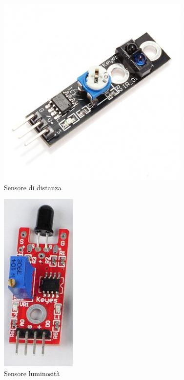 \documentclass[a4paper,titlepage]{book}
\begin{document}
\begin{figure}[!h]
\centering
\includegraphics[scale=0.5]{dist2.jpg}
\caption{Sensore di distanza}
\end{figure}


\begin{figure}[!h]
\centering
\includegraphics[scale=0.6]{lumi.png}
\caption{Sensore luminosità}
\end{figure}
\end{document}
